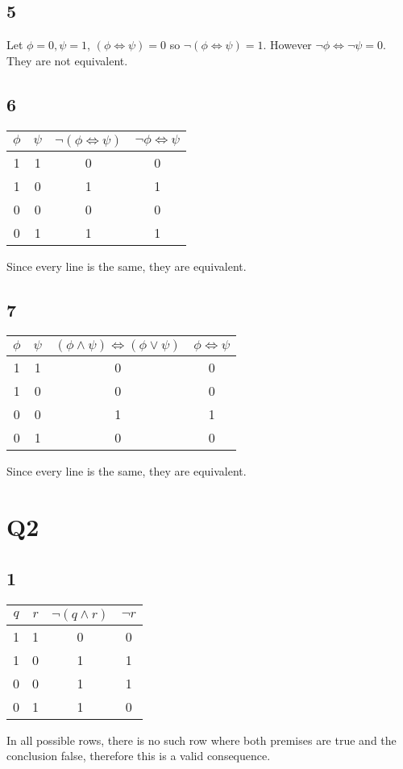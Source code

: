 \documentclass[12pt]{article}
\begin{document}
\subsection{5}
Let $\phi = 0, \psi = 1$, $(\phi \iff \psi) = 0$ so $\neg(\phi \iff \psi) = 1$.
However $\neg\phi \iff \neg \psi = 0$. They are not equivalent.

\subsection{6}
\begin{tabular}{ | c | c | c | c|}
    \hline
    $\phi$ & $\psi$ & $\neg(\phi \iff \psi)$ & $\neg \phi \iff \psi$\\
    \hline
    1 & 1 & 0 & 0 \\
    \hline
    1 & 0 & 1 & 1 \\
    \hline
    0 & 0 & 0 & 0 \\
    \hline
    0 & 1 & 1 & 1 \\
    \hline
\end{tabular}
\newline
Since every line is the same, they are equivalent.

\subsection{7}
\begin{tabular}{ | c | c | c | c|}
    \hline
    $\phi$ & $\psi$ & $(\phi \land \psi) \iff (\phi \lor \psi)$ & $\phi \iff \psi$\\
    \hline
    1 & 1 & 0 & 0 \\
    \hline
    1 & 0 & 0 & 0 \\
    \hline
    0 & 0 & 1 & 1 \\
    \hline
    0 & 1 & 0 & 0 \\
    \hline
\end{tabular}
\newline
Since every line is the same, they are equivalent.


\section{Q2}
\subsection{1}
\begin{tabular}{ | c | c | c | c |}
    \hline
    $q$ & $r$ & $\neg(q \land r)$ & $\neg r$ \\
    \hline
    1 & 1 & 0 & 0 \\
    \hline
    1 & 0 & 1 & 1 \\
    \hline
    0 & 0 & 1 & 1 \\
    \hline
    0 & 1 & 1 & 0 \\
    \hline
\end{tabular}
\newline
In all possible rows, there is no such row where both premises are true and the
conclusion false, therefore this is a valid consequence.
\end{document}
